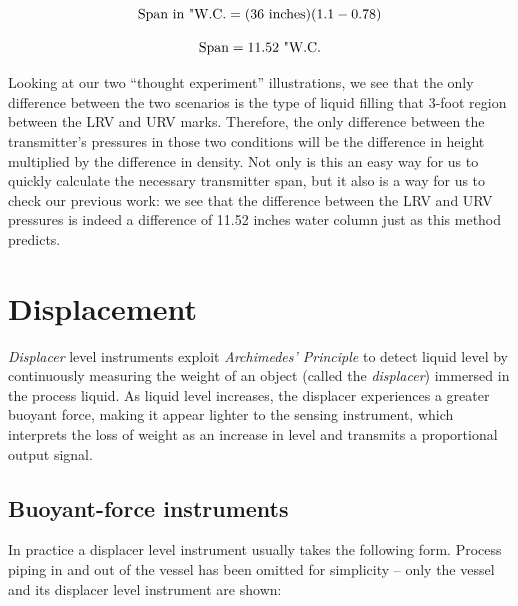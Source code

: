 $$\hbox{Span in "W.C.} = (36 \hbox{ inches})(1.1 - 0.78)$$

$$\hbox{Span} = 11.52 \hbox{ "W.C.}$$

Looking at our two ``thought experiment'' illustrations, we see that the only difference between the two scenarios is the type of liquid filling that 3-foot region between the LRV and URV marks.  Therefore, the only difference between the transmitter's pressures in those two conditions will be the difference in height multiplied by the difference in density.  Not only is this an easy way for us to quickly calculate the necessary transmitter span, but it also is a way for us to check our previous work: we see that the difference between the LRV and URV pressures is indeed a difference of 11.52 inches water column just as this method predicts.    





\filbreak
\section{Displacement}

\textit{Displacer} level instruments exploit \textit{Archimedes' Principle} to detect liquid level by continuously measuring the weight of an object (called the \textit{displacer}) immersed in the process liquid.  As liquid level increases, the displacer experiences a greater buoyant force, making it appear lighter to the sensing instrument, which interprets the loss of weight as an increase in level and transmits a proportional output signal.   





\filbreak
\subsection{Buoyant-force instruments}

In practice a displacer level instrument usually takes the following form.  Process piping in and out of the vessel has been omitted for simplicity -- only the vessel and its displacer level instrument are shown:

